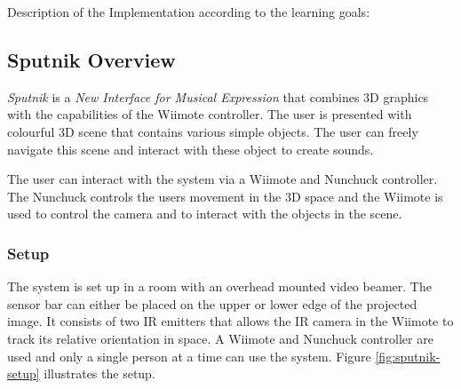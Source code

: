 \documentclass[10pt,a4paper]{scrartcl}
\begin{document}
Description of the Implementation according to the learning goals:




\subsection{Sputnik Overview}

\emph{Sputnik} is a \emph{New Interface for Musical Expression} that combines 3D graphics with the capabilities of the Wiimote controller. The user is presented with colourful 3D scene that contains various simple objects. The user can freely navigate this scene and interact with these object to create sounds.

The user can interact with the system via a Wiimote and Nunchuck controller. The Nunchuck controls the users movement in the 3D space and the Wiimote is used to control the camera and to interact with the objects in the scene. 

\subsubsection{Setup}
The system is set up in a room with an overhead mounted video beamer. The sensor bar can either be placed on the upper or lower edge of the projected image. It consists of two IR emitters that allows the IR camera in the Wiimote to track its relative orientation in space. A Wiimote and Nunchuck controller are used and only a single person at a time can use the system. Figure \ref{fig:sputnik-setup} illustrates the setup.
\end{document}
